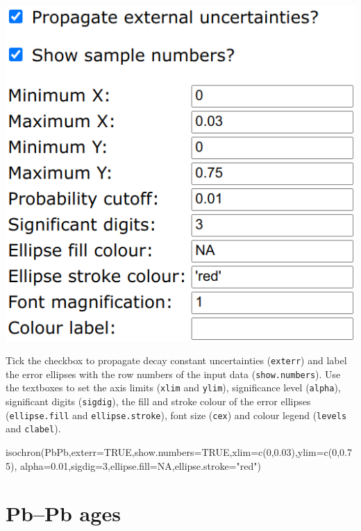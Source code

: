 \begin{refsection}
\begin{enumerate}
\noindent\begin{minipage}[t]{.4\linewidth}
\strut\vspace*{-\baselineskip}\newline
\includegraphics[width=\linewidth]{../figures/PbPbIsochronOtherOptions.png}
\end{minipage}
\begin{minipage}[t]{.6\linewidth}
  Tick the checkbox to propagate decay constant uncertainties
  (\texttt{exterr}) and label the error ellipses with the row numbers
  of the input data (\texttt{show.numbers}). Use the textboxes to set
  the axis limits (\texttt{xlim} and \texttt{ylim}), significance
  level (\texttt{alpha}), significant digits (\texttt{sigdig}), the
  fill and stroke colour of the error ellipses (\texttt{ellipse.fill}
  and \texttt{ellipse.stroke}), font size (\texttt{cex}) and colour
  legend (\texttt{levels} and \texttt{clabel}).
\end{minipage}

\begin{script}
isochron(PbPb,exterr=TRUE,show.numbers=TRUE,xlim=c(0,0.03),ylim=c(0,0.75),
         alpha=0.01,sigdig=3,ellipse.fill=NA,ellipse.stroke="red")
\end{script}
  
\end{enumerate}

\section{Pb--Pb ages}\label{sec:PbPbAges}


\end{refsection}

